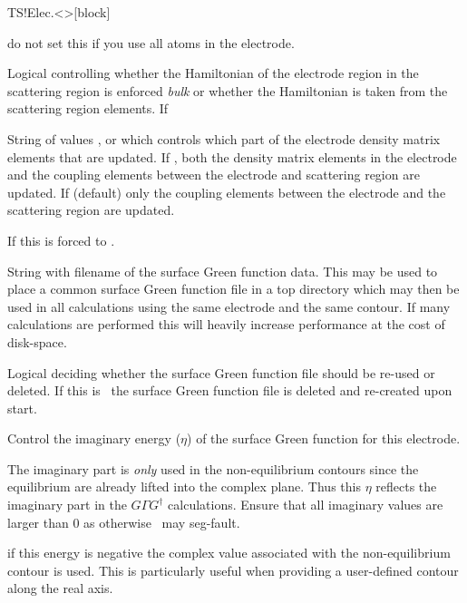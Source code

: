 \begin{fdfentry}{TS!Elec.<>}[block]
\begin{fdfoptions}
    \note do not set this if you use all atoms in the electrode.

    \option[Bulk]%
    Logical controlling whether the Hamiltonian of the electrode
    region in the scattering region is enforced \emph{bulk} or whether
    the Hamiltonian is taken from the scattering region elements. If

    \option[DM-update]%
    String of values ,  or 
    which controls which part of the electrode density matrix elements
    that are updated. If , both the density matrix elements
    in the electrode and the coupling elements between the electrode
    and scattering region are updated. If  (default)
    only the coupling elements between the electrode and the
    scattering region are updated.

    If  this is forced to .

    \option[Gf]%
    String with filename of the surface Green function data. This may
    be used to place a common surface Green function file in a top
    directory which may then be used in all calculations using the
    same electrode and the same contour. 
    If many calculations are performed this will heavily increase
    performance at the cost of disk-space.

    \option[Gf-Reuse]%
    Logical deciding whether the surface Green function file should be
    re-used or deleted.
    If this is \fdffalse\ the surface Green function file is deleted
    and re-created upon start.
    
    \option[Eta]%
    Control the imaginary energy ($\eta$) of the surface Green
    function for this electrode.

    The imaginary part is \emph{only} used in the non-equilibrium
    contours since the equilibrium are already lifted into the complex
    plane. Thus this $\eta$ reflects the imaginary part in the
    $G\Gamma G^\dagger$ calculations. Ensure that all imaginary values
    are larger than $0$ as otherwise \tsiesta\ may seg-fault.

    \note if this energy is negative the complex value associated with
    the non-equilibrium contour is used. This is particularly useful
    when providing a user-defined contour along the real axis.


\end{fdfoptions}
\end{fdfentry}
